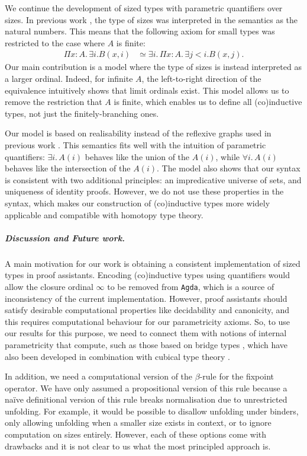 \documentclass[10pt,a4paper]{article}
\theoremstyle{definition}
\theoremstyle{remark}
\renewcommand{\.}{.\,} %
\renewcommand{\:}{:} %
\newcommand{\0}{\mathbf{0}}
\newcommand{\1}{\mathbf{1}}
\newcommand\<\langle
\renewcommand\>\rangle
\theoremstyle{remark}
\begin{document}
We continue the development of sized types with parametric quantifiers over sizes.
In previous work \cite{licentiate, parametric-quantifier}, the type of sizes was interpreted in the semantics as the natural numbers.
This means that the following axiom for small types was restricted to the case where \(A\) is finite: \begin{align*}
    \Pi{x : A} \. \exists i . B(x, i)&\simeq\exists i\. \Pi {x : A} \. \exists j < i . B(x, j). \tag{\(\exists\) parametric over \(\Pi\)}
\end{align*}
Our main contribution is a model where the type of sizes is instead interpreted as a larger ordinal.
Indeed, for infinite \(A\), the left-to-right direction of the equivalence intuitively shows that limit ordinals exist.
This model allows us to remove the restriction that \(A\) is finite, which enables us to define all (co)inductive types, not just the finitely-branching ones.

Our model is based on realisability instead of the reflexive graphs used in previous work \cite{licentiate, parametric-quantifier}.
This semantics fits well with the intuition of parametric quantifiers: \(\exists i.\,A(i)\) behaves like the union of the \(A(i)\), while \(\forall i.\,A(i)\) behaves like the intersection of the \(A(i)\).
The model also shows that our syntax is consistent with two additional principles: an impredicative universe of sets, and uniqueness of identity proofs.
However, we do not use these properties in the syntax, which makes our construction of (co)inductive types more widely applicable and compatible with homotopy type theory.

\subparagraph*{Discussion and Future work.}

A main motivation for our work is obtaining a consistent implementation of sized types in proof assistants.
Encoding (co)inductive types using quantifiers would allow the closure ordinal \(\infty\) to be removed from \texttt{Agda}, which is a source of inconsistency of the current implementation.
However, proof assistants should satisfy desirable computational properties like decidability and canonicity, and this requires computational behaviour for our parametricity axioms.
So, to use our results for this purpose, we need to connect them with notions of internal parametricity that compute, such as those based on bridge types \cite{parametric-quantifier}, which have also been developed in combination with cubical type theory \cite{cavallo2021internal,parametricity-agda}.

In addition, we need a computational version of the $\beta$-rule for the fixpoint operator.
We have only assumed a propositional version of this rule because a na\"ive definitional version of this rule breaks normalisation due to unrestricted unfolding.
For example, it would be possible to disallow unfolding under binders, only allowing unfolding when a smaller size exists in context, or to ignore computation on sizes entirely.
However, each of these options come with drawbacks and it is not clear to us what the most principled approach is.
\end{document}
